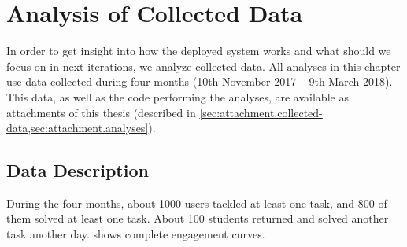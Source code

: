 \chapter{Analysis of Collected Data}
\label{chap:analysis}


In order to get insight into how the deployed system works
and what should we focus on in next iterations,
we analyze collected data.
All analyses in this chapter use data collected  %
during four months (10th November 2017 -- 9th March 2018).
This data, as well as the code performing the analyses, are available
as attachments of this thesis
(described in \cref{sec:attachment.collected-data,sec:attachment.analyses}).


\section{Data Description}

During the four months, about 1000 users tackled at least one task,
and 800 of them solved at least one task.
About 100 students returned and solved another task another day.
 shows complete engagement curves.

